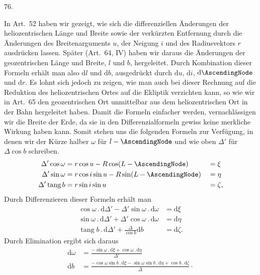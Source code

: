 \par{}\medskip
\hypertarget{native-099-article076}{}
\begin{center}76.\end{center}
In Art.\ 52 haben wir gezeigt, wie sich die differenziellen Änderungen der heliozentrischen Länge und Breite sowie der verkürzten Entfernung durch die Änderungen des Breitenarguments $u$, der Neigung $i$ und des Radiusvektors $r$ ausdrücken lassen. Später (Art.\ 64, IV) haben wir daraus die Änderungen der geozentrischen Länge und Breite, $l$ und $b$, hergeleitet. Durch Kombination dieser Formeln erhält man also $\mathrm{d}l$ und $\mathrm{d}b$, ausgedrückt durch $\mathrm{d}u$, $\mathrm{d}i$, $\mathrm{d}\AscendingNode$ und $\mathrm{d}r$. Es lohnt sich jedoch zu zeigen, wie man auch bei dieser Rechnung auf die Reduktion des heliozentrischen Ortes auf die Ekliptik verzichten kann, so wie wir in Art.\ 65 den geozentrischen Ort unmittelbar aus dem heliozentrischen Ort in der Bahn hergeleitet haben. Damit die Formeln einfacher werden, vernachlässigen wir die Breite der Erde, da sie in den Differenzialformeln gewiss keine merkliche Wirkung haben kann. Somit stehen uns die folgenden Formeln zur Verfügung, in denen wir der Kürze halber $\omega$ für $l-\AscendingNode$ und wie oben $\Delta'$ für $\Delta\cos b$ schreiben.
\[
\begin{aligned}
\Delta'\cos\omega &= r\cos u - R\cos(L-\AscendingNode) &&= \xi\\
\Delta'\sin\omega &= r\cos i\sin u - R\sin(L-\AscendingNode) &&= \eta\\
\Delta'\operatorname{tang}b &= r\sin i\sin u &&= \zeta,
\end{aligned}
\]
\noindent Durch Differenzieren dieser Formeln erhält man
\[
\begin{aligned}
\cos\omega\mathbin{.}\mathrm{d}\Delta' - \Delta'\sin\omega\mathbin{.}\mathrm{d}\omega &= \mathrm{d}\xi\\
\sin\omega\mathbin{.}\mathrm{d}\Delta' + \Delta'\cos\omega\mathbin{.}\mathrm{d}\omega &= \mathrm{d}\eta\\
\operatorname{tang}b\mathbin{.}\mathrm{d}\Delta' + \frac{\Delta}{\cos b}\mathrm{d}b &= \mathrm{d}\zeta.
\end{aligned}
\]
\noindent Durch Elimination ergibt sich daraus
\[
\begin{aligned}
\mathrm{d}\omega &= \frac{-\sin\omega\mathbin{.}\mathrm{d}\xi+\cos\omega\mathbin{.}\mathrm{d}\eta}{\Delta'}\\
\mathrm{d}b &= \frac{-\cos\omega\sin b\mathbin{.}\mathrm{d}\xi-\sin\omega\sin b\mathbin{.}\mathrm{d}\eta+\cos b\mathbin{.}\mathrm{d}\zeta}{\Delta}\mathpunct{\cdot}
\end{aligned}
\]

